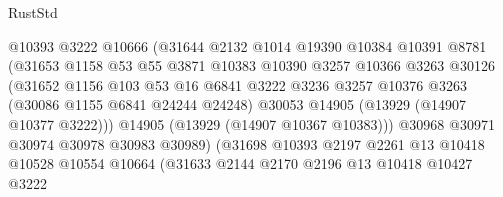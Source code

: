\begin{lexlean}{RustStd}
\begin{coremodule}
                                @10393
                                @3222
                                @10666
                                (@31644
                                  @2132
                                  @1014
                                  @19390
                                  @10384
                                  @10391
                                  @8781
                                  (@31653
                                    @1158
                                    @53
                                    @55
                                    @3871
                                    @10383
                                    @10390
                                    @3257
                                    @10366
                                    @3263
                                    @30126
                                    (@31652
                                      @1156
                                      @103
                                      @53
                                      @16
                                      @6841
                                      @3222
                                      @3236
                                      @3257
                                      @10376
                                      @3263
                                      (@30086 @1155 @6841 @24244 @24248)
                                      @30053
                                      @14905
                                      (@13929 (@14907 @10377 @3222)))
                                    @14905
                                    (@13929 (@14907 @10367 @10383)))
                                  @30968
                                  @30971
                                  @30974
                                  @30978
                                  @30983
                                  @30989)
                                (@31698
                                  @10393
                                  @2197
                                  @2261
                                  @13
                                  @10418
                                  @10528
                                  @10554
                                  @10664
                                  (@31633
                                    @2144
                                    @2170
                                    @2196
                                    @13
                                    @10418
                                    @10427
                                    @3222

\end{coremodule}
\end{lexlean}
